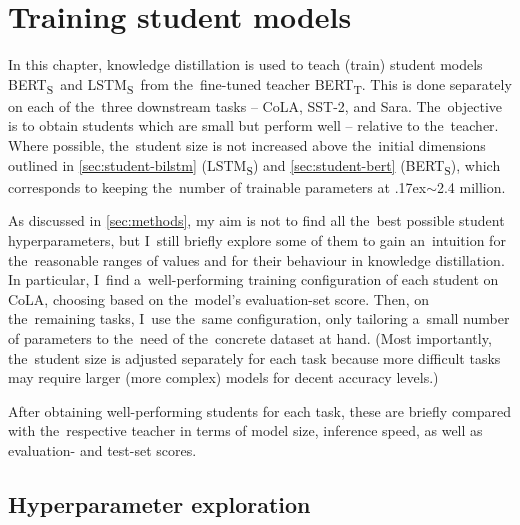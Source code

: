\documentclass[bsc,frontabs,singlespacing,parskip,deptreport]{infthesis}
\def\mytilde{{\raise.17ex\hbox{$\scriptstyle\sim$}}}
\def\BERTT{BERT\textsubscript{T}}
\def\BERTS{BERT\textsubscript{S}}
\def\LSTMS{LSTM\textsubscript{S}}
\begin{document}
\chapter{Training student models}{
  In this chapter, knowledge distillation is used to teach (train) student models \BERTS~and \LSTMS~from the~fine-tuned teacher \BERTT. This is done separately on each of the~three downstream tasks -- CoLA, SST-2, and Sara.
  The~objective is to obtain students which are small but perform well -- relative to the~teacher. Where possible, the~student size is not increased above the~initial dimensions outlined in \autoref{sec:student-bilstm} (\LSTMS) and \autoref{sec:student-bert} (\BERTS), which corresponds to keeping the~number of trainable parameters at \mytilde2.4 million.

  As discussed in \autoref{sec:methods}, my aim is not to find all the~best possible student hyperparameters, but I~still briefly explore some of them to gain an~intuition for the~reasonable ranges of values and for their behaviour in knowledge distillation.
  In particular, I~find a~well-performing training configuration of each student on CoLA, choosing based on the~model's evaluation-set score. Then, on the~remaining tasks, I~use the~same configuration, only tailoring a~small number of parameters to the~need of the~concrete dataset at hand. (Most importantly, the~student size is adjusted separately for each task because more difficult tasks may require larger (more complex) models for decent accuracy levels.)

  After obtaining well-performing students for each task, these are briefly compared with the~respective teacher in terms of model size, inference speed, as well as evaluation- and test-set scores.

  \section{Hyperparameter exploration}{
    \label{sec:hparam-general}

}}
\end{document}
